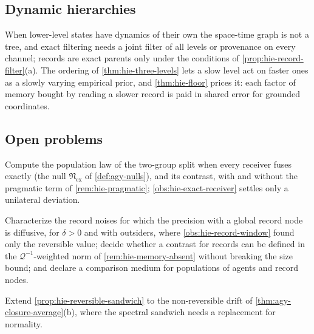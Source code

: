 \subsection{Dynamic hierarchies}\label{sup:hie-dynamic-hierarchies}

\begin{remark}\label{rem:hie-dynamic}
When lower-level states have dynamics of their own the space-time graph is not a tree, and exact filtering needs a joint filter of all levels or provenance on every channel; records are exact parents only under the conditions of \cref{prop:hie-record-filter}(a). The ordering of \cref{thm:hie-three-levels} lets a slow level act on faster ones as a slowly varying empirical prior, and \cref{thm:hie-floor} prices it: each factor of memory bought by reading a slower record is paid in shared error for grounded coordinates.
\end{remark}

\subsection{Open problems}\label{sec:hie-open}

\begin{openproblem}\label{open:hie-exact-fusion-population}
Compute the population law of the two-group split when every receiver fuses exactly (the null $\mathfrak N_{\mathrm{ex}}$ of \cref{def:agy-nulls}), and its contrast, with and without the pragmatic term of \cref{rem:hie-pragmatic}; \cref{obs:hie-exact-receiver} settles only a unilateral deviation.
\end{openproblem}

\begin{openproblem}\label{open:hie-record-contrast}
Characterize the record noises for which the precision with a global record node is diffusive, for $\delta>0$ and with outsiders, where \cref{obs:hie-record-window} found only the reversible value; decide whether a contrast for records can be defined in the $\mathcal Q^{-1}$-weighted norm of \cref{rem:hie-memory-absent} without breaking the size bound; and declare a comparison medium for populations of agents and record nodes.
\end{openproblem}

\begin{openproblem}\label{open:hie-nonreversible}
Extend \cref{prop:hie-reversible-sandwich} to the non-reversible drift of \cref{thm:agy-closure-average}(b), where the spectral sandwich needs a replacement for normality.
\end{openproblem}

